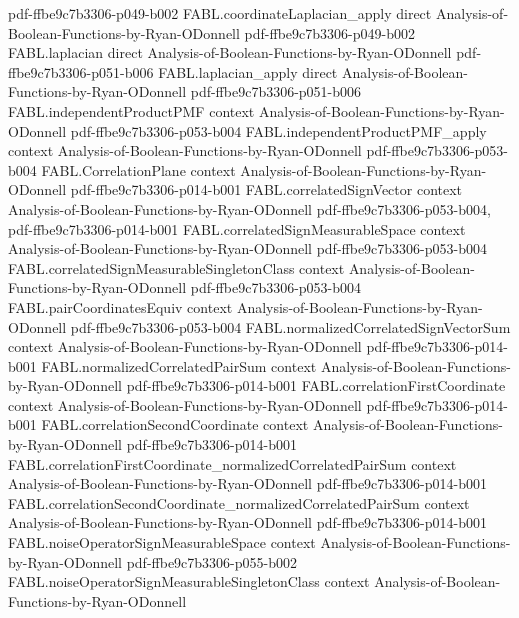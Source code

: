 \begin{theorem}
  {pdf-ffbe9c7b3306-p049-b002}
\proofstep
  {FABL.coordinateLaplacian_apply}
  {direct}
  {Analysis-of-Boolean-Functions-by-Ryan-ODonnell}
  {pdf-ffbe9c7b3306-p049-b002}
\proofstep
  {FABL.laplacian}
  {direct}
  {Analysis-of-Boolean-Functions-by-Ryan-ODonnell}
  {pdf-ffbe9c7b3306-p051-b006}
\proofstep
  {FABL.laplacian_apply}
  {direct}
  {Analysis-of-Boolean-Functions-by-Ryan-ODonnell}
  {pdf-ffbe9c7b3306-p051-b006}
\proofstep
  {FABL.independentProductPMF}
  {context}
  {Analysis-of-Boolean-Functions-by-Ryan-ODonnell}
  {pdf-ffbe9c7b3306-p053-b004}
\proofstep
  {FABL.independentProductPMF_apply}
  {context}
  {Analysis-of-Boolean-Functions-by-Ryan-ODonnell}
  {pdf-ffbe9c7b3306-p053-b004}
\proofstep
  {FABL.CorrelationPlane}
  {context}
  {Analysis-of-Boolean-Functions-by-Ryan-ODonnell}
  {pdf-ffbe9c7b3306-p014-b001}
\proofstep
  {FABL.correlatedSignVector}
  {context}
  {Analysis-of-Boolean-Functions-by-Ryan-ODonnell}
  {pdf-ffbe9c7b3306-p053-b004,
    pdf-ffbe9c7b3306-p014-b001}
\proofstep
  {FABL.correlatedSignMeasurableSpace}
  {context}
  {Analysis-of-Boolean-Functions-by-Ryan-ODonnell}
  {pdf-ffbe9c7b3306-p053-b004}
\proofstep
  {FABL.correlatedSignMeasurableSingletonClass}
  {context}
  {Analysis-of-Boolean-Functions-by-Ryan-ODonnell}
  {pdf-ffbe9c7b3306-p053-b004}
\proofstep
  {FABL.pairCoordinatesEquiv}
  {context}
  {Analysis-of-Boolean-Functions-by-Ryan-ODonnell}
  {pdf-ffbe9c7b3306-p053-b004}
\proofstep
  {FABL.normalizedCorrelatedSignVectorSum}
  {context}
  {Analysis-of-Boolean-Functions-by-Ryan-ODonnell}
  {pdf-ffbe9c7b3306-p014-b001}
\proofstep
  {FABL.normalizedCorrelatedPairSum}
  {context}
  {Analysis-of-Boolean-Functions-by-Ryan-ODonnell}
  {pdf-ffbe9c7b3306-p014-b001}
\proofstep
  {FABL.correlationFirstCoordinate}
  {context}
  {Analysis-of-Boolean-Functions-by-Ryan-ODonnell}
  {pdf-ffbe9c7b3306-p014-b001}
\proofstep
  {FABL.correlationSecondCoordinate}
  {context}
  {Analysis-of-Boolean-Functions-by-Ryan-ODonnell}
  {pdf-ffbe9c7b3306-p014-b001}
\proofstep
  {FABL.correlationFirstCoordinate_normalizedCorrelatedPairSum}
  {context}
  {Analysis-of-Boolean-Functions-by-Ryan-ODonnell}
  {pdf-ffbe9c7b3306-p014-b001}
\proofstep
  {FABL.correlationSecondCoordinate_normalizedCorrelatedPairSum}
  {context}
  {Analysis-of-Boolean-Functions-by-Ryan-ODonnell}
  {pdf-ffbe9c7b3306-p014-b001}
\proofstep
  {FABL.noiseOperatorSignMeasurableSpace}
  {context}
  {Analysis-of-Boolean-Functions-by-Ryan-ODonnell}
  {pdf-ffbe9c7b3306-p055-b002}
\proofstep
  {FABL.noiseOperatorSignMeasurableSingletonClass}
  {context}
  {Analysis-of-Boolean-Functions-by-Ryan-ODonnell}

\end{theorem}
